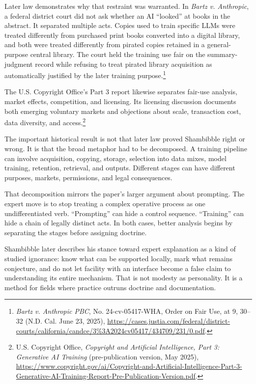 \documentclass[11pt]{article}
\begin{document}
Later law demonstrates why that restraint was warranted. In \emph{Bartz v. Anthropic}, a federal district court did not ask whether an AI ``looked'' at books in the abstract. It separated multiple acts. Copies used to train specific LLMs were treated differently from purchased print books converted into a digital library, and both were treated differently from pirated copies retained in a general-purpose central library. The court held the training use fair on the summary-judgment record while refusing to treat pirated library acquisition as automatically justified by the later training purpose.\footnote{\emph{Bartz v. Anthropic PBC}, No. 24-cv-05417-WHA, Order on Fair Use, at 9, 30--32 (N.D. Cal. June 23, 2025), \url{https://cases.justia.com/federal/district-courts/california/candce/3\%3A2024cv05417/434709/231/0.pdf}.}

The U.S. Copyright Office's Part 3 report likewise separates fair-use analysis, market effects, competition, and licensing. Its licensing discussion documents both emerging voluntary markets and objections about scale, transaction cost, data diversity, and access.\footnote{U.S. Copyright Office, \emph{Copyright and Artificial Intelligence, Part 3: Generative AI Training} (pre-publication version, May 2025), \url{https://www.copyright.gov/ai/Copyright-and-Artificial-Intelligence-Part-3-Generative-AI-Training-Report-Pre-Publication-Version.pdf}.}

The important historical result is not that later law proved Shambibble right or wrong. It is that the broad metaphor had to be decomposed. A training pipeline can involve acquisition, copying, storage, selection into data mixes, model training, retention, retrieval, and outputs. Different stages can have different purposes, markets, permissions, and legal consequences.

That decomposition mirrors the paper's larger argument about prompting. The expert move is to stop treating a complex operative process as one undifferentiated verb. ``Prompting'' can hide a control sequence. ``Training'' can hide a chain of legally distinct acts. In both cases, better analysis begins by separating the stages before assigning doctrine.

Shambibble later describes his stance toward expert explanation as a kind of studied ignorance: know what can be supported locally, mark what remains conjecture, and do not let facility with an interface become a false claim to understanding its entire mechanism. That is not modesty as personality. It is a method for fields where practice outruns doctrine and documentation.
\end{document}

